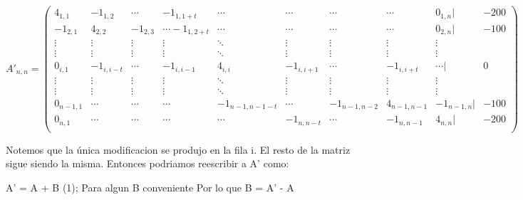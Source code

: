 \documentclass[a4paper]{article}
\begin{document}
$$
A'_{n,n} =
 \begin{pmatrix}
  4_{1,1} & -1_{1,2} & \cdots & -1_{1,1+t} & \cdots & \cdots & \cdots & \cdots  & 0_{1,n} | & -200 \\
   -1_{2,1} & 4_{2,2} & -1_{2,3} & \cdots -1_{1,2+t} & \cdots & \cdots & \cdots & \cdots & 0_{2,n} | & -100 \\
  \vdots  & \vdots  & \vdots & \vdots  & \ddots & \vdots  & \vdots & \vdots & \vdots\\
  \vdots  & \vdots & \vdots & \vdots  & \ddots & \vdots  & \vdots & \vdots & \vdots\\
   0_{i,1} & -1_{i,i-t} & \cdots & -1_{i,i-1} & 4_{i,i} &  -1_{i,i+1} & \cdots & -1_{i,i+t} & \cdots | & 0 \\
  \vdots  & \vdots  & \vdots & \vdots  & \ddots  & \vdots  & \vdots & \vdots & \vdots\\
  \vdots  & \vdots  & \vdots & \vdots  & \ddots  & \vdots  & \vdots & \vdots & \vdots\\
   0_{n-1,1} & \cdots & \cdots & \cdots & -1_{n-1,n-1-t} & \cdots & -1_{n-1,n-2} & 4_{n-1,n-1} &  -1_{n-1,n} | & -100 \\
   0_{n,1} & \cdots & \cdots & \cdots & \cdots & -1_{n,n-t} & \cdots & -1_{n,n-1} &  4_{n,n} | & -200 \\
 \end{pmatrix}
$$


Notemos que la única modificacion se produjo en la fila i. El resto de la matriz sigue siendo la misma. Entonces podriamos reescribir a A' como:

A' = A + B (1);\newline
Para algun B conveniente\newline
Por lo que 
B = A' - A \newline
\end{document}
